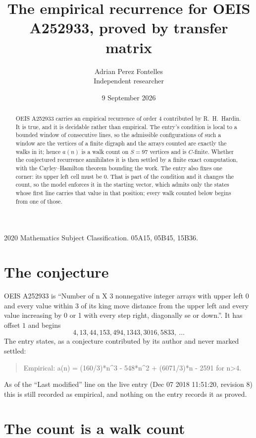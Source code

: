 \documentclass[11pt,a4paper]{article}
\title{The empirical recurrence for OEIS A252933, proved by transfer matrix}
\author{Adrian Perez Fontelles\\ \small Independent researcher}
\date{9 September 2026}
\theoremstyle{plain}
\theoremstyle{definition}
\begin{document}
\maketitle

\begin{abstract}
OEIS A252933 carries an empirical recurrence of order $4$ contributed by R.~H.~Hardin. It is
true, and it is decidable rather than empirical. The entry's condition is local to a bounded window of consecutive lines, so
the admissible configurations of such a window are the vertices of a finite digraph and the
arrays counted are exactly the walks in it; hence $a(n)$ is a walk count on $S=97$ vertices
and is $C$-finite. Whether the conjectured recurrence annihilates it is then settled by a
finite exact computation, with the Cayley--Hamilton theorem bounding the work.
 The entry also fixes one corner: its upper left cell must be $0$. That is part of the condition and it changes the count, so the model enforces it in the starting vector, which admits only the states whose first line carries that value in that position; every walk counted below begins from one of those.\end{abstract}

\noindent\small 2020 Mathematics Subject Classification. 05A15, 05B45, 15B36.\normalsize

\section{The conjecture}

OEIS A252933 is ``Number of n X 3 nonnegative integer arrays with upper left 0 and every value within 3 of its king move distance from the upper left and every value increasing by 0 or 1 with every step right, diagonally se or down.''. It has offset $1$ and begins
\[
4, 13, 44, 153, 494, 1343, 3016, 5833,\ \dots
\]
The entry states, as a conjecture contributed by its author and never marked settled:
\begin{quote}
Empirical: a(n) = (160/3)*n\^{}3 - 548*n\^{}2 + (6071/3)*n - 2591 for n>4.
\end{quote}
As of the ``Last modified'' line on the live entry (Dec 07 2018 11:51:20, revision 8) this is still
recorded as empirical, and nothing on the entry records it as proved.

\section{The count is a walk count}
\end{document}
